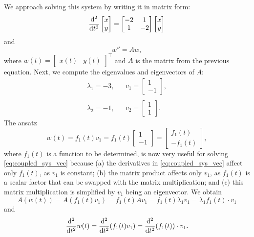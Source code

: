 \begin{application}
We approach solving this system by writing it in matrix form:
\[ \displaystyle{\frac{\mathrm{d}^2 }{\mathrm{d}t^2}} \begin{bmatrix} x \\ y \end{bmatrix} =
\begin{bmatrix} -2 & 1 \\ 1 & -2 \end{bmatrix} 
\begin{bmatrix} x \\ y \end{bmatrix} \]
and 
\begin{equation}\label{eq:coupled_sys_vec} w'' = A w, \end{equation}
where $w(t) = \begin{bmatrix}
	x(t) & y(t)
\end{bmatrix}^\top$ and $A$ is the matrix from the previous equation. Next, we compute the eigenvalues and eigenvectors of $A$:
\[ \begin{array}{ccc}
	\lambda_1 = - 3, & & v_1 = \begin{bmatrix} 1 \\ -1 \end{bmatrix}, \\ & & \\
	\lambda_2 = - 1, & & v_2 = \begin{bmatrix} 1 \\ 1 \end{bmatrix}.
\end{array} \]
The ansatz
\[ w(t) = f_1(t) v_1 = f_1(t) \begin{bmatrix} 1 \\ -1 \end{bmatrix}
= \begin{bmatrix} f_1(t) \\ -f_1(t) \end{bmatrix}, \]
where $f_1(t)$ is a function to be determined, is now very useful for solving \eqref{eq:coupled_sys_vec} because (a) the derivatives in \eqref{eq:coupled_sys_vec} affect only $f_1(t)$, as $v_1$ is constant; (b) the matrix product affects only $v_1$, as $f_1(t)$ is a scalar factor that can be swapped with the matrix multiplication; and (c) this matrix multiplication is simplified by $v_1$ being an eigenvector. We obtain
\[ A\left(w(t)\right) = A (f_1(t)v_1) = f_1(t) A v_1 = f_1(t) \lambda_1 v_1 = \lambda_1 f_1(t) \cdot v_1 \]
and
\begin{equation}
\label{eq:derivative_of_vector}
 \Ddf{}{t} w(t) = \Ddf{}{t} (f_1(t)v_1) = \Ddf{}{t} (f_1(t)) \cdot v_1.

\end{equation}
\end{application}
